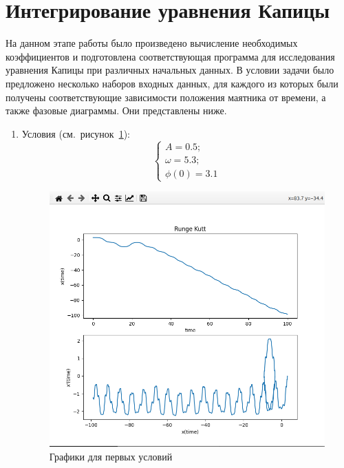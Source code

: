 \documentclass[a4paper,12pt]{article}
\begin{document}
	\section{Интегрирование уравнения Капицы}
	На данном этапе работы было произведено вычисление необходимых 
	коэффициентов и подготовлена соответствующая программа для исследования 
	уравнения Капицы при различных начальных данных. В условии задачи было 
	предложено несколько наборов входных данных, для каждого из которых были 
	получены соответствующие зависимости положения маятника от времени, а 
	также фазовые диаграммы. Они представлены ниже.
	\begin{enumerate}
		\item Условия (см.~рисунок~\ref{fig:1_praq}):
		\begin{equation}
			\begin{cases}
				A = 0.5; \\
				\omega = 5.3; \\
				\phi(0) = 3.1
			\end{cases}
		\end{equation}

		\newpage

		\begin{figure}[ht!]
			\begin{center}
			\includegraphics[scale=0.3]{sources/1_praq.png}
			\end{center}
			\vspace*{-8mm}
			\caption{Графики для первых условий}\label{fig:1_praq}
	  	\end{figure}


\end{enumerate}
\end{document}

